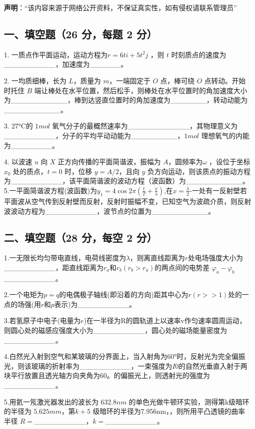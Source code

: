 
\textbf{声明}：“该内容来源于网络公开资料，不保证真实性，如有侵权请联系管理员”

\subsection{一、填空题（26 分，每题 2 分）}
1. 一质点作平面运动，运动方程为$r=6ti+5t^2j$ ，则 $t$ 时刻质点的速度为__________，加速度为______。

2. 一均质细棒，长为 $L$，质量为 $m$，一端固定于 $O$ 点，棒可绕 $O$ 点转动。开始时托住 $B$ 端让棒处在水平位置，然后松手，则棒处在水平位置时的角加速度大小为___________，棒到达竖直位置时的角加速度为_______，转动动能为___________。

3. 27°C的 $1mol$ 氧气分子的最概然速率为____________，其物理意义为__________，分子的平均平动动能为_________，$1mol$ 理想氧气的内能为________。

4. 以波速 $u$ 向 $X$ 正方向传播的平面简谐波，振幅为 $A$，圆频率为$\omega$ ，设位于坐标 $x_0$ 处的质点，$t=0$ 时，位移 $y=A/2$，且向 $y$ 负方向运动，则该质点的振动方程为__________，该平面简谐波的波动方程（波函数）为___________。
5.一平面简谐波方程(波函数)为$y_1=4\cos2\pi(\frac{t}{T}+\frac{x}{\lambda})$,在$x=\frac{\lambda}{2}$-一处有一反射壁若平面波从空气传到反射壁而反射，反射时振幅不变，已知空气为波疏介质，则反射波波动方程为__________，波节点的位置为___________。
\subsection{二、填空题（28 分，每空 2 分）}
1.一无限长均匀带电直线，电荷线密度为$\lambda$，则离直线距离为$r$处电场强度大小为__________，距直线距离为$r_a$和$r_b(r_b>r_a)$的两点间的电势差 $\varphi_a-\varphi_b$__________。

2.一个电矩为$p=q$的电偶极子轴线(即沿着的方向)距其中心为$r(r>>1)$处的一点的场强(用$r$和$p$表示)为__________。

3.若氢原子中电子(电量为$e$)在一半径为R的圆轨道上以速率v作匀速率圆周运动，则圆心处的磁感应强度大小为__________，圆心处的磁场能量密度为__________。

4.白然光入射到空气和某玻璃的分界面上，当入射角为60°时，反射光为完全偏振光，则该玻璃的折射率为__________，一束强度为$I0$的自然光垂直入射于两块平行放置且透光轴方向夹角为60。的偏振光上，则透射光的强度为__________。

5.用氦一氖激光器发出的波长为 $632.8nm$ 的单色光做牛顿环实验，测得第k级暗环的半径为 $5.625mm$，第$k+5$ 级暗环的半径为7.956nm，，则所用平凸透镜的曲率半径 $R=$__________，$k=$__________。

